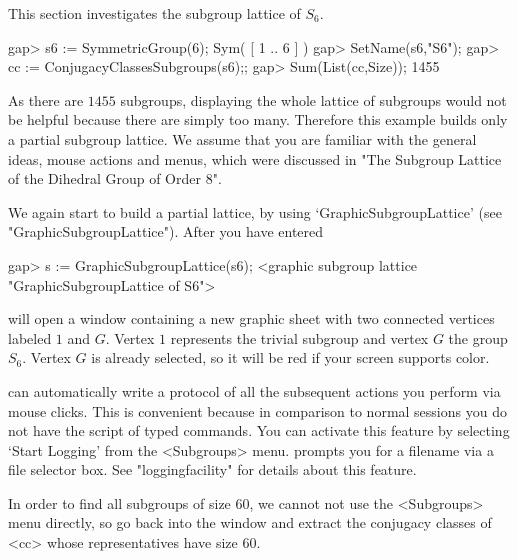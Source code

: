 

This section investigates the subgroup lattice of $S_6$.

\begintt
gap> s6 := SymmetricGroup(6);
Sym( [ 1 .. 6 ] )
gap> SetName(s6,"S6");
gap> cc := ConjugacyClassesSubgroups(s6);;
gap> Sum(List(cc,Size));
1455
\endtt

As there are $1455$ subgroups,  displaying  the whole lattice of  subgroups
would not  be helpful because  there are simply  too many.   Therefore this
example builds only a partial  subgroup lattice.   We  assume that you  are
familiar with  the  general ideas,  mouse   actions and  menus, which  were
discussed in "The Subgroup Lattice of the Dihedral Group of Order 8".

We again start to build a partial lattice, by using
`GraphicSubgroupLattice' (see "GraphicSubgroupLattice").  After you have
entered

\begintt
gap> s := GraphicSubgroupLattice(s6);
<graphic subgroup lattice "GraphicSubgroupLattice of S6">
\endtt

{\XGAP}  will open  a window  containing  a new  graphic  sheet with  two
connected vertices   labeled  $1$ and $G$.     Vertex  $1$ represents the
trivial subgroup and  vertex $G$ the group $S_6$.   Vertex $G$ is already
selected, so it will be red if your screen supports color.

{\XGAP} can automatically write a protocol of all the subsequent
actions you perform via mouse clicks. This is convenient because in
comparison to normal {\GAP} sessions you do not have the script of
typed commands. You can activate this feature by selecting `Start
Logging' from the <Subgroups> menu. {\XGAP} prompts you for a filename 
via a file selector box. See "loggingfacility" for details about this
feature. 

In order  to  find all subgroups   of size $60$, we  cannot   not use the
<Subgroups> menu directly, so go back into the  {\GAP} window and extract
the conjugacy classes of <cc> whose representatives have size $60$.


